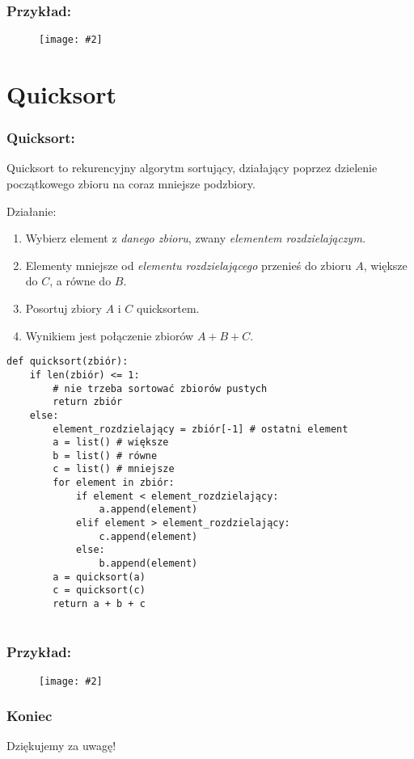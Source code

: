 \documentclass{beamer}
\newcommand{\obrazek}[2]{
        \begin{figure}[h]
            \centering
            \texttt{[image: \#2]}
        \end{figure}
    }
\begin{document}
    \begin{frame}
        \frametitle{Przykład:}
        \obrazek{.5}{binarySearchExample.png}
    \end{frame}

    \section{Quicksort}
    \begin{frame}
        \frametitle{Quicksort:}
            Quicksort to rekurencyjny algorytm sortujący, działający poprzez dzielenie początkowego zbioru na coraz mniejsze podzbiory. 
            \vspace{5mm}

            Działanie:
            \begin{enumerate}
                \item Wybierz element z \emph{danego zbioru}, zwany \emph{elementem rozdzielajączym.}
                \item Elementy mniejsze od \emph{elementu rozdzielającego} przenieś do zbioru $A$, większe do $C$, a równe do $B$.
                \item Posortuj zbiory $A$ i $C$ quicksortem.
                \item Wynikiem jest połączenie zbiorów $A + B + C$.
            \end{enumerate}
    \end{frame}
    \begin{verbatim}
def quicksort(zbiór):
    if len(zbiór) <= 1:
        # nie trzeba sortować zbiorów pustych 
        return zbiór
    else:
        element_rozdzielający = zbiór[-1] # ostatni element
        a = list() # większe
        b = list() # równe
        c = list() # mniejsze
        for element in zbiór:
            if element < element_rozdzielający:
                a.append(element)
            elif element > element_rozdzielający:
                c.append(element)
            else:
                b.append(element)
        a = quicksort(a)
        c = quicksort(c)
        return a + b + c
        
    \end{verbatim}

    \begin{frame}
        \frametitle{Przykład:}
        \obrazek{.5}{quicksortExample.png}
    \end{frame}

    \begin{frame}
        \frametitle{Koniec}
        \begin{center}
            Dziękujemy za uwagę!
        \end{center}
    \end{frame}
\end{document}
